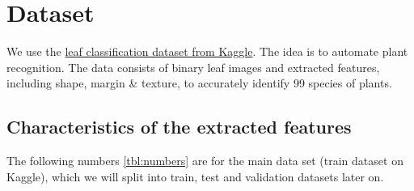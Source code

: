 \documentclass{sig-alternate-05-2015}
\begin{document}
%
\author{
%
%
\alignauthor
Stefan Beyer\\
       \\
\alignauthor
Georg Heiler\\
       \\
}
\date{30 July 1999}

\maketitle

\section{Dataset}
We use the \href{https://www.kaggle.com/c/leaf-classification}{leaf classification dataset from Kaggle}. The idea is to automate plant recognition. The data consists of binary leaf images and extracted features, including shape, margin \& texture, to accurately identify 99 species of plants.

\subsection{Characteristics of the extracted features}
The following numbers \ref{tbl:numbers} are for the main data set (train dataset on Kaggle), which we will split into train, test and validation datasets later on.
\end{document}
